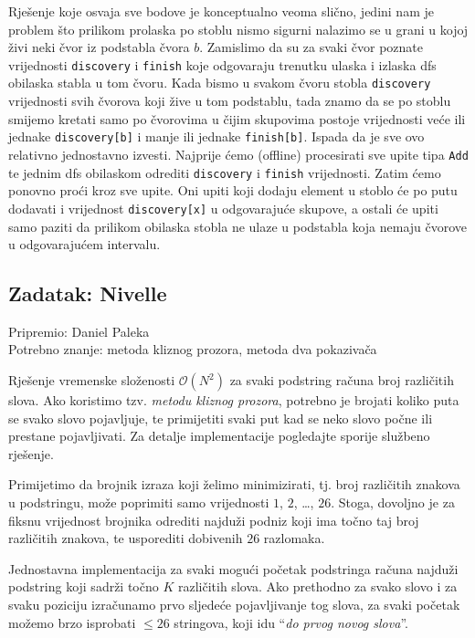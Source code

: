 \documentclass[a4paper]{article}
\begin{document}
Rješenje koje osvaja sve bodove je konceptualno veoma slično, jedini nam je
problem što prilikom prolaska po stoblu nismo sigurni nalazimo se u grani
u kojoj živi neki čvor iz podstabla čvora $b$. Zamislimo da su za svaki čvor
poznate vrijednosti \texttt{discovery} i \texttt{finish} koje odgovaraju
trenutku ulaska i izlaska dfs obilaska stabla u tom čvoru. Kada bismo u svakom
čvoru stobla \texttt{discovery} vrijednosti svih čvorova koji žive u tom
podstablu, tada znamo da se po stoblu smijemo kretati samo po čvorovima
u čijim skupovima postoje vrijednosti veće ili jednake \texttt{discovery[b]} i
manje ili jednake \texttt{finish[b]}. Ispada da je sve ovo relativno jednostavno
izvesti. Najprije ćemo (offline) procesirati sve upite tipa \texttt{Add} te
jednim dfs obilaskom odrediti \texttt{discovery} i \texttt{finish} vrijednosti.
Zatim ćemo ponovno proći kroz sve upite. Oni upiti koji dodaju element u stoblo
će po putu dodavati i vrijednost \texttt{discovery[x]} u odgovarajuće skupove, a
ostali će upiti samo paziti da prilikom obilaska stobla ne ulaze u podstabla
koja nemaju čvorove u odgovarajućem intervalu.

\subsection*{Zadatak: Nivelle}
\textsf{Pripremio: Daniel Paleka}\\
\textsf{Potrebno znanje: metoda kliznog prozora, metoda dva pokazivača}

Rješenje vremenske složenosti $\mathcal{O}(N^2)$ za svaki podstring računa broj
različitih slova. Ako koristimo tzv. \textit{metodu kliznog prozora}, potrebno
je brojati koliko puta se svako slovo pojavljuje, te primijetiti svaki put kad
se neko slovo počne ili prestane pojavljivati. Za detalje implementacije
pogledajte sporije službeno rješenje.

Primijetimo da brojnik izraza koji želimo minimizirati, tj. broj različitih
znakova u podstringu, može poprimiti samo vrijednosti $1$, $2$, \dots, $26$.
Stoga, dovoljno je za fiksnu vrijednost brojnika odrediti najduži podniz koji
ima točno taj broj različitih znakova, te usporediti dobivenih $26$ razlomaka.

Jednostavna implementacija za svaki mogući početak podstringa računa najduži
podstring koji sadrži točno $K$ različitih slova. Ako prethodno za svako slovo
i za svaku poziciju izračunamo prvo sljedeće pojavljivanje tog slova, za svaki
početak možemo brzo isprobati $\le 26$ stringova, koji idu “\textit{do prvog
novog slova}”.
\end{document}
